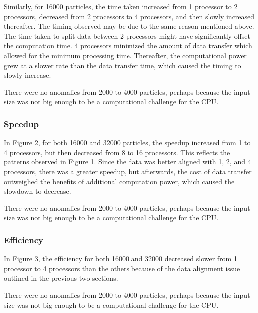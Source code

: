 \documentclass{article}
\begin{document}
Similarly, for 16000 particles, the time taken increased from 1 processor to 2 processors, decreased from 2 processors to 4 processors, and then slowly increased thereafter. The timing observed may be due to the same reason mentioned above. The time taken to split data between 2 processors might have significantly offset the computation time. 4 processors minimized the amount of data transfer which allowed for the minimum processing time. Thereafter, the computational power grew at a slower rate than the data transfer time, which caused the timing to slowly increase.

There were no anomalies from 2000 to 4000 particles, perhaps because the input size was not big enough to be a computational challenge for the CPU.

\subsubsection{Speedup}
In Figure 2, for both 16000 and 32000 particles, the speedup increased from 1 to 4 processors, but then decreased from 8 to 16 processors. This reflects the patterns observed in Figure 1. Since the data was better aligned with 1, 2, and 4 processors, there was a greater speedup, but afterwards, the cost of data transfer outweighed the benefits of additional computation power, which caused the slowdown to decrease.

There were no anomalies from 2000 to 4000 particles, perhaps because the input size was not big enough to be a computational challenge for the CPU.

\subsubsection{Efficiency}
In Figure 3, the efficiency for both 16000 and 32000 decreased slower from 1 processor to 4 processors than the others because of the data alignment issue outlined in the previous two sections. 

There were no anomalies from 2000 to 4000 particles, perhaps because the input size was not big enough to be a computational challenge for the CPU.
\end{document}
